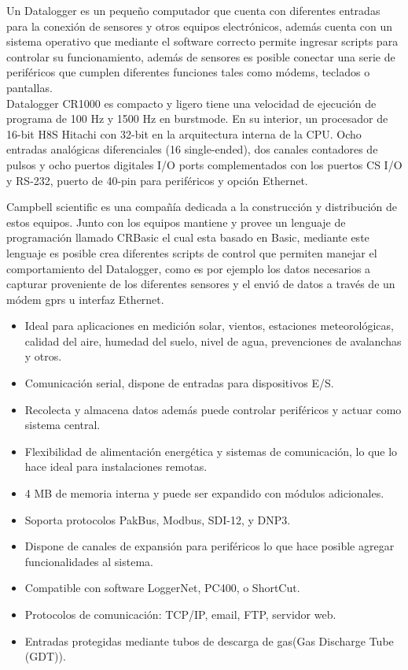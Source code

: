 Un Datalogger es un pequeño computador que cuenta con diferentes entradas para la conexión de sensores y otros equipos electrónicos, además cuenta con un sistema operativo que mediante el software correcto permite ingresar scripts para controlar su funcionamiento, además de sensores es posible conectar una serie de periféricos que cumplen diferentes funciones tales como módems, teclados o pantallas.\\

Datalogger CR1000 es compacto y ligero tiene una velocidad de ejecución de programa de 100 Hz y 1500 Hz en burstmode. En su interior, un procesador de 16-bit H8S Hitachi con 32-bit en la arquitectura interna de la CPU.
Ocho entradas analógicas diferenciales (16 single-ended), dos canales contadores
de pulsos y ocho puertos digitales I/O ports complementados con los puertos CS I/O y RS-232, puerto de 40-pin para periféricos y opción Ethernet.

Campbell scientific es una compañía dedicada a la construcción y distribución de estos equipos. Junto con los equipos mantiene y provee un lenguaje de programación llamado CRBasic el cual esta basado en Basic, mediante este lenguaje es posible crea diferentes scripts de control que permiten manejar el comportamiento del Datalogger, como es por ejemplo los datos necesarios a capturar proveniente de los diferentes sensores y el envió de datos a través de un módem gprs u interfaz Ethernet. 

\begin{itemize}
\item Ideal para aplicaciones en medición solar, vientos, estaciones meteorológicas, calidad del aire, humedad del suelo, nivel de agua, prevenciones de avalanchas y otros.
\item Comunicación serial, dispone de entradas para dispositivos E/S.
\item Recolecta y almacena datos además puede controlar periféricos y actuar como sistema central.
\item Flexibilidad de alimentación energética y sistemas de comunicación, lo que lo hace ideal para instalaciones remotas.
\item 4 MB de memoria interna y puede ser expandido con módulos adicionales.
\item Soporta protocolos PakBus, Modbus, SDI-12, y DNP3.
\item Dispone de canales de expansión para periféricos lo que hace posible agregar funcionalidades al sistema.
\item Compatible con software LoggerNet, PC400, o ShortCut.
\item Protocolos de comunicación: TCP/IP, email, FTP, servidor web.
\item Entradas protegidas mediante tubos de descarga de gas(Gas Discharge Tube (GDT)).
\end{itemize}

